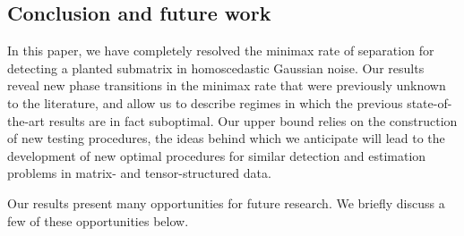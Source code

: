 \documentclass{article}
\theoremstyle{remark}
\begin{document}
\subsection{Conclusion and future work}
In this paper, we have completely resolved the minimax rate of separation for detecting a planted submatrix in homoscedastic Gaussian noise. Our results reveal new phase transitions in the minimax rate that were previously unknown to the literature, and allow us to describe regimes in which the previous state-of-the-art results are in fact suboptimal. Our upper bound relies on the construction of new testing procedures, the ideas behind which we anticipate will lead to the development of new optimal procedures for similar detection and estimation problems in matrix- and tensor-structured data.

Our results present many opportunities for future research. We briefly discuss a few of these opportunities below.
\end{document}
